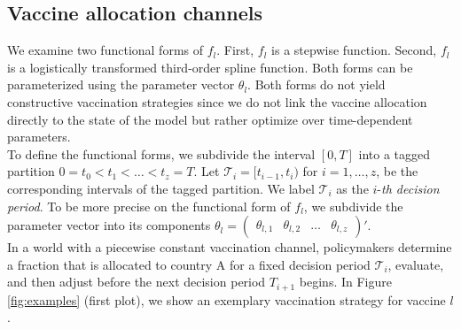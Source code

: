 \subsection{Vaccine allocation channels}
We examine two functional forms of $f_{l}$. First, $f_{l}$ is a stepwise function. Second, $f_{l}$ is a logistically transformed third-order spline function. Both forms can be parameterized using the parameter vector $\theta_l$. Both forms do not yield constructive vaccination strategies since we do not link the vaccine allocation directly to the state of the model but rather optimize over time-dependent parameters.\\

To define the functional forms, we subdivide the interval $[0,T]$ into a tagged partition $0=t_0 < t_1 < \dots < t_z = T$. Let $\mathcal{T}_i = [t_{i-1}, t_{i})$ for $i = 1, \dots, z$, be the corresponding intervals of the tagged partition. We label $\mathcal{T}_i$ as the $i$-\textit{th decision period}. To be more precise on the functional form of $f_l$, we subdivide the parameter vector into its components $\theta_l = \begin{pmatrix}
\theta_{l,1}  & \theta_{l,2} & \dots & \theta_{l,z} \end{pmatrix}'$. \\

In a world with a piecewise constant vaccination channel, policymakers determine a fraction that is allocated to country A for a fixed decision period $\mathcal{T}_i$, evaluate, and then adjust before the next decision period $T_{i+1}$ begins. In Figure \ref{fig:examples} (first plot), we show an exemplary vaccination strategy for vaccine $l$.

